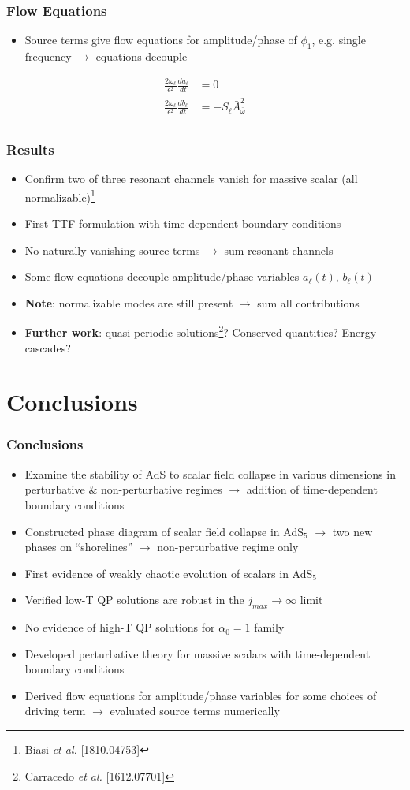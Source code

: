 \documentclass[mathserif,10pt]{beamer}
\newcommand{\bi}{\begin{itemize}}
\newcommand{\ei}{\end{itemize}}
\newcommand{\its}{\item}
\newcommand{\scr}{\scriptsize}
\begin{document}
{\frame
{
  \frametitle{Flow Equations}
  \bi
  \its Source terms give flow equations for amplitude/phase of $\phi_1$, e.g. single frequency $\to$ equations decouple
  \ei
  
  \begin{overlayarea}{\textwidth}{0.5\textheight}
  	\begin{align*}
	\frac{2\omega_\ell}{\epsilon^2} \frac{d a_\ell}{dt} &= 0 \\
	\frac{2 \omega_\ell}{\epsilon^2} \frac{db_\ell}{dt} &= - S_\ell \bar{A}^2_{\bar \omega}
	\end{align*}
  \end{overlayarea}
}


\subsection*{}
\frame
{
  \frametitle{Results}
  \bi
  \its Confirm two of three resonant channels vanish for massive scalar (all normalizable)\footnote{{\scr Biasi {\it et al.} [1810.04753]}}
  \its First TTF formulation with time-dependent boundary conditions
  \its No naturally-vanishing source terms $\to$ sum resonant channels
  \its Some flow equations decouple amplitude/phase variables $a_\ell(t)$, $b_\ell(t)$
  \its {\bf Note}: normalizable modes are still present $\to$ sum all contributions
  \its {\bf Further work}: quasi-periodic solutions\footnote{{\scr Carracedo {\it et al.} [1612.07701]}}? Conserved quantities? Energy cascades?
  \ei

}


{
  \AtBeginSection[]{}
\section{Conclusions}
\frame
{
   \frametitle{Conclusions}
   \bi
   \its Examine the stability of AdS to scalar field collapse in various dimensions in perturbative \& non-perturbative regimes $\to$ addition of time-dependent boundary conditions
   \its<2->{Constructed phase diagram of scalar field collapse in AdS$_5$ $\to$ two new phases on ``shorelines'' $\to$ non-perturbative regime only}
   \its<2->{First evidence of weakly chaotic evolution of scalars in AdS$_5$}
   \its<3->{Verified low-T QP solutions are robust in the $j_{max} \to \infty$ limit}
   \its<3->{No evidence of high-T QP solutions for $\alpha_0 = 1$ family}
   \its<4->{Developed perturbative theory for massive scalars with time-dependent boundary conditions}
   \its<4->{Derived flow equations for amplitude/phase variables for some choices of driving term $\to$ evaluated source terms numerically}
   \ei
}
}}
\end{document}
